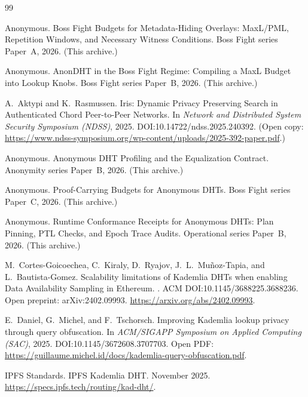 \documentclass[11pt]{article}
\begin{document}
\begin{thebibliography}{99}

Anonymous.
\newblock Boss Fight Budgets for Metadata-Hiding Overlays: MaxL/PML, Repetition Windows, and Necessary Witness Conditions.
\newblock Boss Fight series Paper~A, 2026. (This archive.)

Anonymous.
\newblock AnonDHT in the Boss Fight Regime: Compiling a MaxL Budget into Lookup Knobs.
\newblock Boss Fight series Paper~B, 2026. (This archive.)

A.~Aktypi and K.~Rasmussen.
\newblock Iris: Dynamic Privacy Preserving Search in Authenticated Chord Peer-to-Peer Networks.
\newblock In \emph{Network and Distributed System Security Symposium (NDSS)}, 2025.
\newblock DOI:10.14722/ndss.2025.240392. (Open copy: \url{https://www.ndss-symposium.org/wp-content/uploads/2025-392-paper.pdf}.)

Anonymous.
\newblock Anonymous DHT Profiling and the Equalization Contract.
\newblock Anonymity series Paper~B, 2026. (This archive.)

Anonymous.
\newblock Proof-Carrying Budgets for Anonymous DHTs.
\newblock Boss Fight series Paper~C, 2026. (This archive.)

Anonymous.
\newblock Runtime Conformance Receipts for Anonymous DHTs: Plan Pinning, PTL Checks, and Epoch Trace Audits.
\newblock Operational series Paper~B, 2026. (This archive.)


M.~Cortes-Goicoechea, C.~Kiraly, D.~Ryajov, J.~L.~Mu\~noz-Tapia, and L.~Bautista-Gomez.
\newblock Scalability limitations of Kademlia DHTs when enabling Data Availability Sampling in Ethereum.
.
\newblock ACM DOI:10.1145/3688225.3688236. Open preprint: arXiv:2402.09993. \url{https://arxiv.org/abs/2402.09993}.

E.~Daniel, G.~Michel, and F.~Tschorsch.
\newblock Improving Kademlia lookup privacy through query obfuscation.
\newblock In \emph{ACM/SIGAPP Symposium on Applied Computing (SAC)}, 2025.
\newblock DOI:10.1145/3672608.3707703.
\newblock Open PDF: \url{https://guillaume.michel.id/docs/kademlia-query-obfuscation.pdf}.

IPFS Standards.
\newblock IPFS Kademlia DHT.
 November 2025. \url{https://specs.ipfs.tech/routing/kad-dht/}.


\end{thebibliography}
\end{document}
